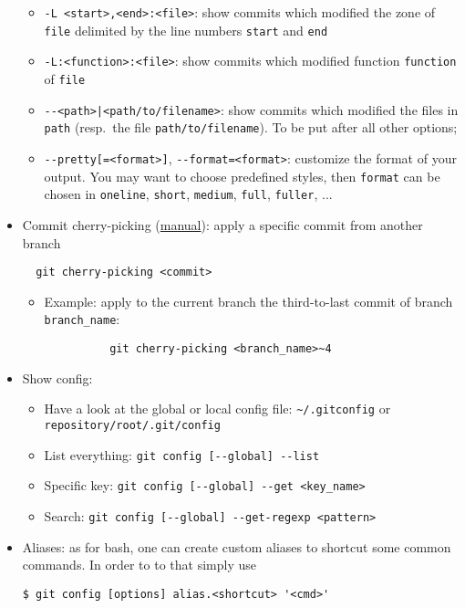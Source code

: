 \documentclass[a4paper,12pt,%
              final%
              ]{article}
\begin{document}
\begin{itemize}
\begin{itemize}
      \item \verb|-L <start>,<end>:<file>|: show commits which modified the zone of \texttt{file} delimited by the line numbers \texttt{start} and \texttt{end}
      \item \verb|-L:<function>:<file>|: show commits which modified function \texttt{function} of \texttt{file}
      \item \verb!--<path>|<path/to/filename>!: show commits which modified the files in \texttt{path} (resp.\ the file \verb|path/to/filename|). To be put after all other options;
      \item \verb|--pretty[=<format>]|, \verb|--format=<format>|: customize the format of your output. You may want to choose predefined styles, then \texttt{format} can be chosen in \texttt{oneline}, \texttt{short}, \texttt{medium}, \texttt{full}, \texttt{fuller}, ...
    \end{itemize}
  \item Commit cherry-picking (\href{https://git-scm.com/docs/git-cherry-pick}{manual}): apply a specific commit from another branch
\begin{verbatim}
  git cherry-picking <commit>
\end{verbatim}
    \begin{itemize}
      \item Example: apply to the current branch the third-to-last commit of branch \verb|branch_name|:
        \begin{verbatim}
          git cherry-picking <branch_name>~4
        \end{verbatim}
    \end{itemize}
  \item Show config:
    \begin{itemize}
      \item Have a look at the global or local config file: \verb|~/.gitconfig| or \verb|repository/root/.git/config|
      \item List everything: \verb|git config [--global] --list|
      \item Specific key: \verb|git config [--global] --get <key_name>|
      \item Search: \verb|git config [--global] --get-regexp <pattern>|
    \end{itemize}
  \item Aliases: as for bash, one can create custom aliases to shortcut some common commands. In order to to that simply use
\begin{verbatim}
$ git config [options] alias.<shortcut> '<cmd>'

\end{verbatim}
\end{itemize}
\end{document}
